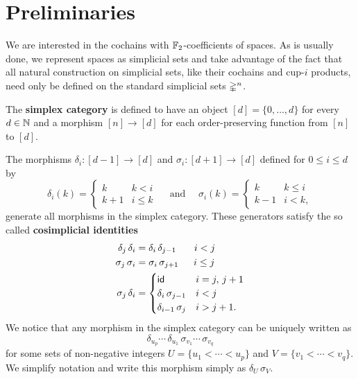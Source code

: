 
\section{Preliminaries}

We are interested in the cochains with ${\mathbb{F}_2}$-coefficients of spaces.
As is usually done, we represent spaces as simplicial sets and take advantage of the fact that all natural construction on simplicial sets, like their cochains and cup-$i$ products, need only be defined on the standard simplicial sets $\mathbb{\Delta}^n$.

The \textbf{simplex category} is defined to have an object $[d] = \{0, \dots, d\}$ for every $d \in \mathbb{N}$ and a morphism $[n] \to [d]$ for each order-preserving function from $[n]$ to $[d]$.

The morphisms $\delta_i \colon [d-1] \to [d]$ and $\sigma_i \colon [d+1] \to [d]$ defined for $0 \leq i \leq d$ by
\[
\delta_i(k) =
\begin{cases} k & k < i \\ k+1 & i \leq k \end{cases}
\quad \text{ and } \quad
\sigma_i(k) =
\begin{cases} k & k \leq i \\ k-1 & i < k, \end{cases}
\]
generate all morphisms in the simplex category.
These generators satisfy the so called \textbf{cosimplicial identities}
\[
\begin{split}
\delta_j \, \delta_i &= \delta_i \, \delta_{j-1} \hspace*{18.5pt} i < j \\
\sigma_j \, \sigma_i &= \sigma_i \, \sigma_{j+1} \hspace*{15.5pt} i \leq j \\
\sigma_j \, \delta_i &=
\begin{cases}
\mathsf{id} & i = j,\, j+1 \\
\delta_i \, \sigma_{j-1} & i < j \\
\delta_{i-1} \, \sigma_{j} & i > j + 1.
\end{cases}
\end{split}
\]
We notice that any morphism in the simplex category can be uniquely written as
\[
\delta_{u_{p}} \cdots\, \delta_{u_1}\, \sigma_{v_1} \cdots\, \sigma_{v_q}
\]
for some sets of non-negative integers $U = \{u_1 < \cdots < u_{p}\}$ and $V = \{v_1 < \cdots < v_{q}\}$.
We simplify notation and write this morphism simply as $\delta_U\, \sigma_V$.

